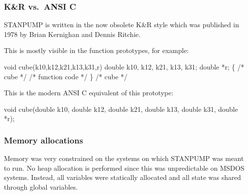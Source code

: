 \documentclass[
  letterpaper,
  DIV=11,
  numbers=noendperiod]{scrartcl}
\newenvironment{Shaded}{\begin{snugshade}}{\end{snugshade}}
\newcommand{\CommentTok}[1]{\textcolor[rgb]{0.37,0.37,0.37}{#1}}
\newcommand{\DataTypeTok}[1]{\textcolor[rgb]{0.68,0.00,0.00}{#1}}
\newcommand{\NormalTok}[1]{\textcolor[rgb]{0.00,0.23,0.31}{#1}}
\newcommand{\OperatorTok}[1]{\textcolor[rgb]{0.37,0.37,0.37}{#1}}
\begin{document}
\subsubsection{K\&R vs.~ANSI C}\label{kr-vs.-ansi-c}

STANPUMP is written in the now obsolete K\&R style which was published
in 1978 by Brian Kernighan and Dennis Ritchie.

This is mostly visible in the function prototypes, for example:

\begin{Shaded}
\begin{Highlighting}[]
\DataTypeTok{void}\NormalTok{ cube}\OperatorTok{(}\NormalTok{k10}\OperatorTok{,}\NormalTok{k12}\OperatorTok{,}\NormalTok{k21}\OperatorTok{,}\NormalTok{k13}\OperatorTok{,}\NormalTok{k31}\OperatorTok{,}\NormalTok{r}\OperatorTok{)}
\DataTypeTok{double}\NormalTok{ k10}\OperatorTok{,}\NormalTok{ k12}\OperatorTok{,}\NormalTok{ k21}\OperatorTok{,}\NormalTok{ k13}\OperatorTok{,}\NormalTok{ k31}\OperatorTok{;}
\DataTypeTok{double} \OperatorTok{*}\NormalTok{r}\OperatorTok{;}
    \OperatorTok{\{}                   \CommentTok{/* cube */}
    \CommentTok{/* function code */}
    \OperatorTok{\}}                   \CommentTok{/* cube */}
\end{Highlighting}
\end{Shaded}

This is the modern ANSI C equivalent of this prototype:

\begin{Shaded}
\begin{Highlighting}[]
\DataTypeTok{void}\NormalTok{ cube}\OperatorTok{(}\DataTypeTok{double}\NormalTok{ k10}\OperatorTok{,} \DataTypeTok{double}\NormalTok{ k12}\OperatorTok{,} \DataTypeTok{double}\NormalTok{ k21}\OperatorTok{,} \DataTypeTok{double}\NormalTok{ k13}\OperatorTok{,} \DataTypeTok{double}\NormalTok{ k31}\OperatorTok{,} \DataTypeTok{double} \OperatorTok{*}\NormalTok{r}\OperatorTok{);}
\end{Highlighting}
\end{Shaded}

\subsubsection{Memory allocations}\label{memory-allocations}

Memory was very constrained on the systems on which STANPUMP was meant
to run. No heap allocation is performed since this was unpredictable on
MSDOS systems. Instead, all variables were statically allocated and all
state was shared through global variables.
\end{document}
